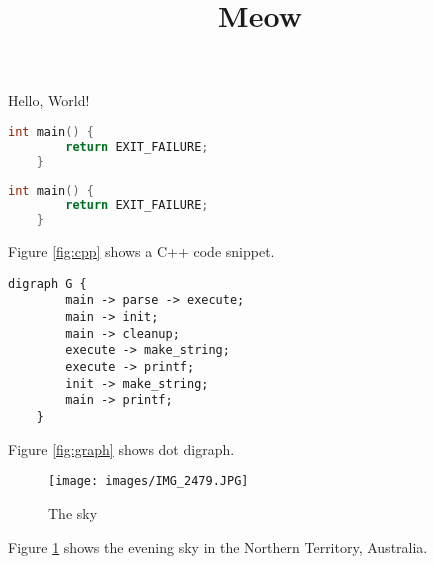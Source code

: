 \documentclass{article}
\begin{document}
\title{Meow}

Hello, World!

\cite{LAK132}

\begin{lstlisting}[language=cpp]
	int main() {
		return EXIT_FAILURE;
	}
\end{lstlisting}

\begin{lstlisting}[label={fig:cpp}, caption={A C++ snippet.}, language=cpp]
	int main() {
		return EXIT_FAILURE;
	}
\end{lstlisting}
Figure \ref{fig:cpp} shows a C++ code snippet.

\begin{lstlisting}[label={fig:graph}, caption={A dot graph.}, language=dot-image]
	digraph G {
		main -> parse -> execute;
		main -> init;
		main -> cleanup;
		execute -> make_string;
		execute -> printf;
		init -> make_string;
		main -> printf;
	}
\end{lstlisting}
Figure \ref{fig:graph} shows dot digraph.

\begin{figure}
	\caption{The sky}
	\label{fig:sky}
	\texttt{[image: images/IMG\_2479.JPG]}
\end{figure}
Figure \ref{fig:sky} shows the evening sky in the Northern Territory, Australia.

\newpage



\end{document}
